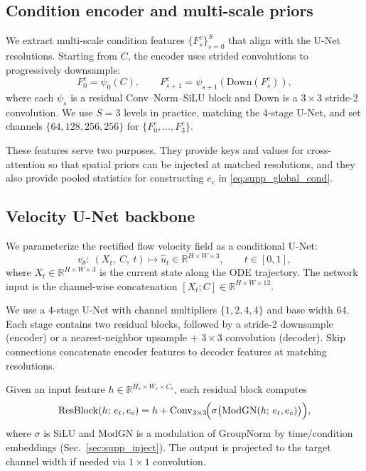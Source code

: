 \documentclass[runningheads]{llncs}
\begin{document}
\subsection{Condition encoder and multi-scale priors}
\label{sec:supp_cond_enc}

We extract multi-scale condition features $\{F^c_s\}_{s=0}^{S}$ that align with the U-Net resolutions. Starting from $C$, the encoder uses strided convolutions to progressively downsample:
\begin{equation}
F^c_{0}=\psi_0(C),\qquad
F^c_{s+1}=\psi_{s+1}\!\left(\mathrm{Down}(F^c_s)\right),
\label{eq:supp_cond_pyramid}
\end{equation}
where each $\psi_s$ is a residual Conv--Norm--SiLU block and $\mathrm{Down}$ is a $3\times 3$ stride-2 convolution. We use $S=3$ levels in practice, matching the 4-stage U-Net, and set channels $\{64,128,256,256\}$ for $\{F^c_0,\dots,F^c_3\}$.

These features serve two purposes. They provide keys and values for cross-attention so that spatial priors can be injected at matched resolutions, and they also provide pooled statistics for constructing $e_c$ in \eqref{eq:supp_global_cond}.

\subsection{Velocity U-Net backbone}
\label{sec:supp_unet}

We parameterize the rectified flow velocity field as a conditional U-Net:
\begin{equation}
v_\theta:\ \left(X_t,\ C,\ t\right)\mapsto \widehat{u}_t\in\mathbb{R}^{H\times W\times 3},
\qquad t\in[0,1],
\end{equation}
where $X_t\in\mathbb{R}^{H\times W\times 3}$ is the current state along the ODE trajectory. The network input is the channel-wise concatenation $[X_t;C]\in\mathbb{R}^{H\times W\times 12}$.

We use a 4-stage U-Net with channel multipliers $\{1,2,4,4\}$ and base width $64$.
Each stage contains two residual blocks, followed by a stride-2 downsample (encoder) or a nearest-neighbor upsample + $3\times 3$ convolution (decoder).
Skip connections concatenate encoder features to decoder features at matching resolutions.

Given an input feature $h\in\mathbb{R}^{H_s\times W_s\times C_s}$, each residual block computes
\begin{equation}
\mathrm{ResBlock}(h;\,e_t,e_c) = h + \mathrm{Conv}_{3\times 3}\!\Bigl(\sigma\bigl(\mathrm{ModGN}(h;\,e_t,e_c)\bigr)\Bigr),
\label{eq:supp_resblock}
\end{equation}
where $\sigma$ is SiLU and $\mathrm{ModGN}$ is a modulation of GroupNorm by time/condition embeddings (Sec.~\ref{sec:supp_inject}). The output is projected to the target channel width if needed via $1\times 1$ convolution.
\end{document}
